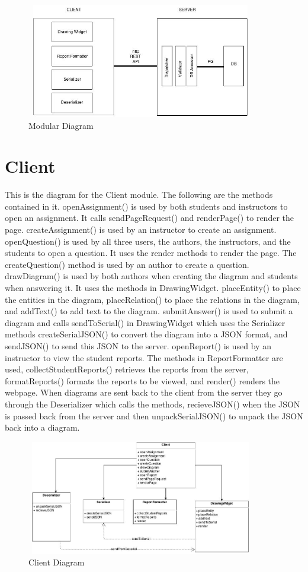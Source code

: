                         \begin{figure}[H]
            \centerline{\includegraphics[height=5cm, width=10cm]{Modular.jpg}}
            \caption{Modular Diagram}
    \end{figure}
    
    \chapter{Client}
This is the diagram for the Client module. The following are the methods contained in it. openAssignment() is used by both students and instructors to open an assignment. It calls sendPageRequest() and renderPage() to render the page. createAssignment() is used by an instructor to create an assignment. openQuestion() is used by all three users, the authors, the instructors, and the students to open a question. It uses the render methods to render the page. The createQuestion() method is used by an author to create a question. drawDiagram() is used by both authors when creating the diagram and students when answering it. It uses the methods in DrawingWidget. placeEntity() to place the entities in the diagram, placeRelation() to place the relations in the diagram, and addText() to add text to the diagram. submitAnswer() is used to submit a diagram and calls sendToSerial() in DrawingWidget which uses the Serializer methods createSerialJSON() to convert the diagram into a JSON format, and sendJSON() to send this JSON to the server. openReport() is used by an instructor to view the student reports. The methods in ReportFormatter are used, collectStudentReports() retrieves the reports from the server, formatReports() formats the reports to be viewed, and render() renders the webpage.  When diagrams are sent back to the client from the server they go through the Deserializer which calls the methods, recieveJSON() when the JSON is passed back from the server and then unpackSerialJSON() to unpack the JSON back into a diagram.
  
                        \begin{figure}[H]
            \centerline{\includegraphics[height=5cm, width=10cm]{Client.jpg}}
            \caption{Client Diagram}
    \end{figure}
    
